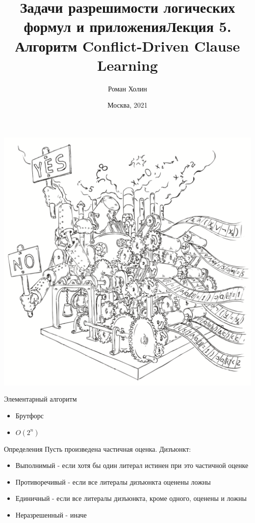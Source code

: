 \documentclass{beamer}
\begin{document}
\title{Задачи разрешимости логических формул и приложения\newline Лекция 5. Алгоритм Conflict-Driven Clause Learning}
\author{Роман Холин}
\date{Москва, 2021}

\begin{frame}
\includegraphics[scale=0.5]{../decision-procedure.png}
\end{frame}

\frame{\titlepage}

\begin{frame}{Элементарный алгоритм}
\begin{itemize}
\item Брутфорс
\item $O(2^n)$
\end{itemize}
\end{frame}

\begin{frame}{Определения}
Пусть произведена частичная оценка.\newline
Дизъюнкт:
\begin{itemize}
\item Выполнимый - если хотя бы один литерал истинен при это частичной оценке
\item Противоречивый - если все литералы дизъюнкта оценены ложны
\item Единичный - если все литералы дизъюнкта, кроме одного, оценены и ложны
\item Неразрешенный - иначе
\end{itemize}
\end{frame}
\end{document}
